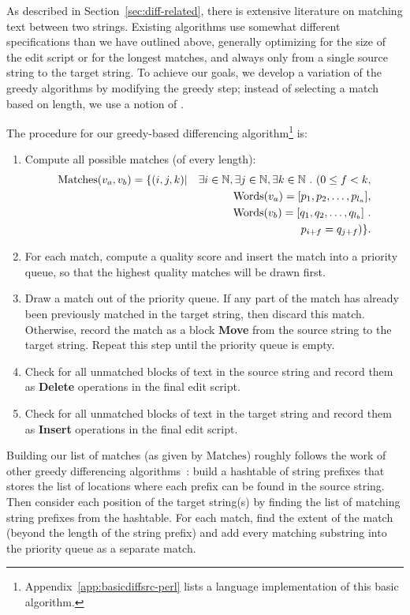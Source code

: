 As described in Section~\ref{sec:diff-related}, there is extensive
literature on matching text between two strings.
Existing algorithms use somewhat different specifications than
we have outlined above, generally optimizing for the size of the edit
script or for the longest matches, and always only from a single
source string to the target string.
To achieve our goals, we develop a variation of
the greedy algorithms
by modifying the greedy step; instead of selecting a match
based on length, we use a notion of .

The procedure for our greedy-based differencing
algorithm\footnote{Appendix~\ref{app:basicdiffsrc-perl} lists a
\perl language implementation of this basic algorithm.}
is:
\begin{enumerate}
\item Compute all possible matches (of every length):
\begin{eqnarray*}
\mathrm{Matches}(v_{a}, v_{b}) = \{ (i,j,k) & |
            & \exists i \in \mathbb{N}, \exists j \in \mathbb{N},
              \exists k \in \mathbb{N} \ .\  (
    0 \le f < k, \\
    & & \mathrm{Words}(v_{a}) = [ p_1, p_2, \ldots, p_{l_a} ], \\
    & & \mathrm{Words}(v_{b}) = [ q_1, q_2, \ldots, q_{l_b} ] \ . \\
    & & p_{i+f} = q_{j+f} ) \}.
\end{eqnarray*}

\item For each match, compute a quality score and insert the match into
    a priority queue, so that the highest quality matches will
    be drawn first.
\item Draw a match out of the priority queue.
    If any part of the match has already been previously matched
    in the target string, then discard this match.
    Otherwise, record the match as a block \textbf{Move}
    from the source string to the target string.
    Repeat this step until the priority queue is empty.
\item Check for all unmatched blocks of text in the source
    string and record them as \textbf{Delete} operations
    in the final edit script.
\item Check for all unmatched blocks of text in the target
    string and record them as \textbf{Insert} operations
    in the final edit script.
\end{enumerate}

Building our list of matches (as given by $\mathrm{Matches}$)
roughly follows the work of other greedy differencing
algorithms~\cite{Reichenberger1991,Burns1997}:
build a hashtable of string prefixes that stores the list
of locations where each prefix can be found in the source string.
Then consider each position of the target string(s) by finding
the list of matching string prefixes from the hashtable.
For each match, find the extent of the match
(beyond the length of the string prefix)
and add every matching substring into the priority queue
as a separate match.

